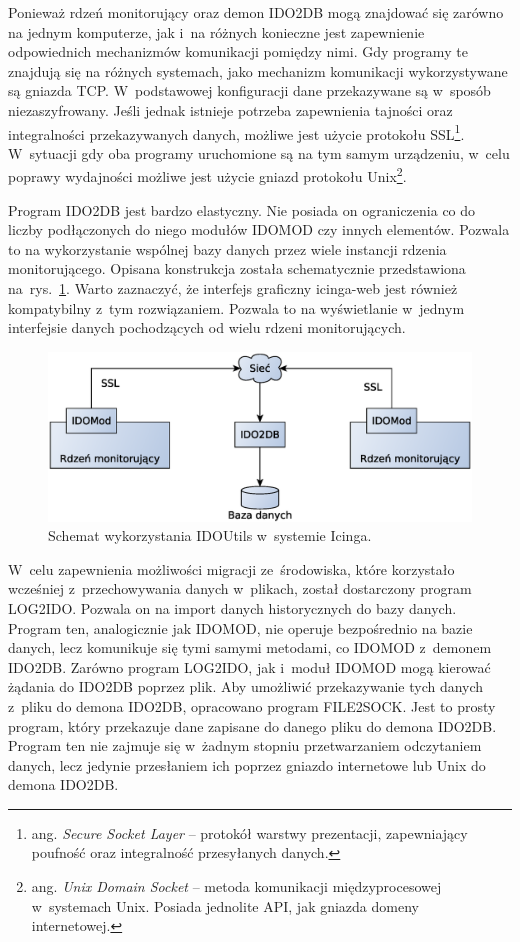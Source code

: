Ponieważ rdzeń monitorujący oraz demon IDO2DB mogą znajdować się
zarówno na jednym komputerze, jak i~na różnych konieczne jest
zapewnienie odpowiednich mechanizmów komunikacji pomiędzy nimi.  Gdy
programy te znajdują się na różnych systemach, jako mechanizm
komunikacji wykorzystywane są gniazda TCP. W~podstawowej konfiguracji
dane przekazywane są w~sposób niezaszyfrowany. Jeśli jednak istnieje
potrzeba zapewnienia tajności oraz integralności przekazywanych
danych, możliwe jest użycie protokołu SSL\footnote{ ang. {\em Secure
    Socket Layer} -- protokół warstwy prezentacji, zapewniający
  poufność oraz integralność przesyłanych danych.}. W~sytuacji gdy oba
programy uruchomione są na tym samym urządzeniu, w~celu poprawy
wydajności możliwe jest użycie gniazd protokołu Unix\footnote{
  ang. {\em Unix Domain Socket} -- metoda komunikacji międzyprocesowej
  w~systemach Unix. Posiada jednolite API, jak gniazda domeny
  internetowej.}.

Program IDO2DB jest bardzo elastyczny. Nie posiada on ograniczenia co
do liczby podłączonych do niego modułów IDOMOD czy innych
elementów. Pozwala to na wykorzystanie wspólnej bazy danych przez
wiele instancji rdzenia monitorującego. Opisana konstrukcja została
schematycznie przedstawiona na~rys.~\ref{fig:IDOUtils}. Warto
zaznaczyć, że interfejs graficzny icinga-web jest również kompatybilny
z~tym rozwiązaniem. Pozwala to na wyświetlanie w~jednym interfejsie
danych pochodzących od wielu rdzeni monitorujących.

\begin{figure}[ht]
  \caption{Schemat wykorzystania IDOUtils w~systemie Icinga.}
  \label{fig:IDOUtils}
\includegraphics[width=1\textwidth]{img/idoutils}
\end{figure}

W~celu zapewnienia możliwości migracji ze~środowiska, które korzystało
wcześniej z~przechowywania danych w~plikach, został dostarczony
program LOG2IDO. Pozwala on na import danych historycznych do bazy
danych. Program ten, analogicznie jak IDOMOD, nie operuje bezpośrednio
na bazie danych, lecz komunikuje się tymi samymi metodami, co IDOMOD
z~demonem IDO2DB. Zarówno program LOG2IDO, jak i~moduł IDOMOD mogą
kierować żądania do IDO2DB poprzez plik. Aby umożliwić przekazywanie
tych danych z~pliku do demona IDO2DB, opracowano program
FILE2SOCK. Jest to prosty program, który przekazuje dane zapisane do
danego pliku do demona IDO2DB. Program ten nie zajmuje się w~żadnym
stopniu przetwarzaniem odczytaniem danych, lecz jedynie przesłaniem
ich poprzez gniazdo internetowe lub Unix do demona IDO2DB.

